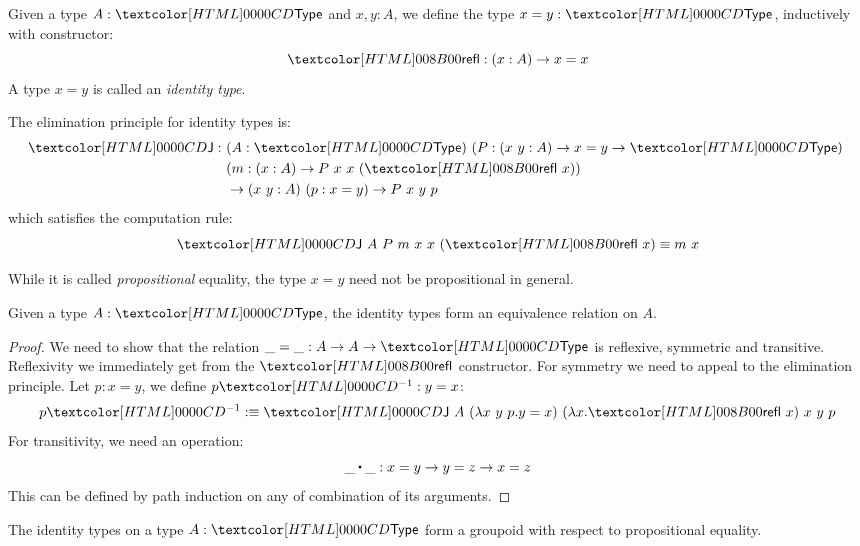 \begin{definition}
  Given a type $A : \Type$ and $x, y : A$, we define the type
  $x = y : \Type$, inductively with constructor:
  $$
  \refl : (x : A) \to x = x
  $$
  A type $x = y$ is called an \emph{identity type}.
  
  The elimination principle for identity types is:
  \begin{align*}
  \J : &\ (A : \Type)\ (P : (x\ y : A) \to x = y \to \Type)\ \\
  &\ (m : (x : A) \to P\ x\ x\ (\refl\ x)) \\
  &\ \to (x\ y : A)\ (p : x = y) \to P\ x\ y\ p
  \end{align*}
  which satisfies the computation rule:
  $$
  \J\ A\ P\ m\ x\ x\ (\refl\ x) \defeq m\ x
  $$
\end{definition}

\begin{remark}
  While it is called \emph{propositional} equality, the type $x = y$
  need not be propositional in general.
\end{remark}

\begin{lemma}
  Given a type $A : \Type$, the identity types form an equivalence
  relation on $A$.
\end{lemma}

\begin{proof}
  We need to show that the relation $\_ = \_ : A \to A \to \Type$ is
  reflexive, symmetric and transitive. Reflexivity we immediately get
  from the $\refl$ constructor. For symmetry we need to appeal to the
  elimination principle. Let $p : x = y$, we define $\sym{p} : y = x$:
  $$
  \sym{p} \ddefeq \J\ A\ (\lambda x\ y\ p . y = x)\ (\lambda x . \refl\ x)\ x\ y\ p
  $$
  For transitivity, we need an operation:
  $$
  \trans{\_}{\_} : x = y \to y = z \to x = z
  $$
  This can be defined by path induction on any of combination of its
  arguments.
\end{proof}

\begin{lemma}
  The identity types on a type $A : \Type$ form a groupoid with
  respect to propositional equality.
\end{lemma}

